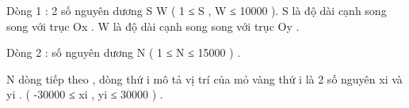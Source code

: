 Dòng 1 : 2 số nguyên dương S W ( 1 ≤ S , W ≤ 10000 ). S là độ dài cạnh song song với trục Ox . W là độ dài cạnh song song với trục Oy .   


   Dòng 2 : số nguyên dương N ( 1 ≤ N ≤ 15000 ) .   


   N dòng tiếp theo , dòng thứ i mô tả vị trí của mỏ vàng thứ i là 2 số nguyên xi và yi . ( -30000 ≤ xi , yi ≤ 30000 ) .